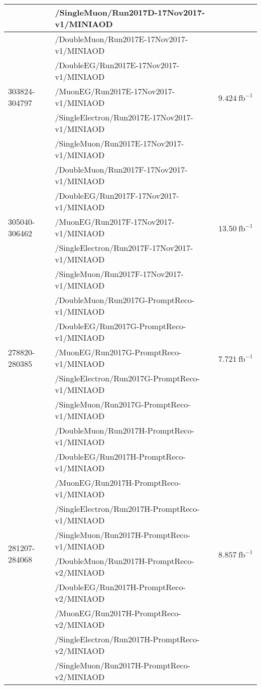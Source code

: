 \begin{table}[h]
\begin{tabular}{|l|l|l|}
& /SingleMuon/Run2017D-17Nov2017-v1/MINIAOD &  \\
\hline
\multirow{5}{*}{303824-304797} & /DoubleMuon/Run2017E-17Nov2017-v1/MINIAOD &  \multirow{5}{*}{$9.424\ \text{fb}^{-1}$} \\
& /DoubleEG/Run2017E-17Nov2017-v1/MINIAOD &  \\
& /MuonEG/Run2017E-17Nov2017-v1/MINIAOD &  \\
& /SingleElectron/Run2017E-17Nov2017-v1/MINIAOD &  \\
& /SingleMuon/Run2017E-17Nov2017-v1/MINIAOD &  \\
\hline
\multirow{5}{*}{305040-306462} & /DoubleMuon/Run2017F-17Nov2017-v1/MINIAOD &  \multirow{5}{*}{$13.50\ \text{fb}^{-1}$} \\
& /DoubleEG/Run2017F-17Nov2017-v1/MINIAOD &  \\
& /MuonEG/Run2017F-17Nov2017-v1/MINIAOD &  \\
& /SingleElectron/Run2017F-17Nov2017-v1/MINIAOD &  \\
& /SingleMuon/Run2017F-17Nov2017-v1/MINIAOD &  \\
\hline
\multirow{5}{*}{278820-280385} & /DoubleMuon/Run2017G-PromptReco-v1/MINIAOD &  \multirow{5}{*}{$7.721\ \text{fb}^{-1}$} \\
 & /DoubleEG/Run2017G-PromptReco-v1/MINIAOD &  \\
 & /MuonEG/Run2017G-PromptReco-v1/MINIAOD &  \\
 & /SingleElectron/Run2017G-PromptReco-v1/MINIAOD &  \\
 & /SingleMuon/Run2017G-PromptReco-v1/MINIAOD &  \\
 \hline
 \multirow{15}{*}{281207-284068} & /DoubleMuon/Run2017H-PromptReco-v1/MINIAOD &  \multirow{15}{*}{$8.857\ \text{fb}^{-1}$} \\
 & /DoubleEG/Run2017H-PromptReco-v1/MINIAOD &  \\
 & /MuonEG/Run2017H-PromptReco-v1/MINIAOD &  \\
 & /SingleElectron/Run2017H-PromptReco-v1/MINIAOD &  \\
 & /SingleMuon/Run2017H-PromptReco-v1/MINIAOD &  \\
 & /DoubleMuon/Run2017H-PromptReco-v2/MINIAOD &  \\
 & /DoubleEG/Run2017H-PromptReco-v2/MINIAOD &  \\
 & /MuonEG/Run2017H-PromptReco-v2/MINIAOD &  \\
 & /SingleElectron/Run2017H-PromptReco-v2/MINIAOD &  \\
 & /SingleMuon/Run2017H-PromptReco-v2/MINIAOD &  \\

\end{tabular}
\end{table}

